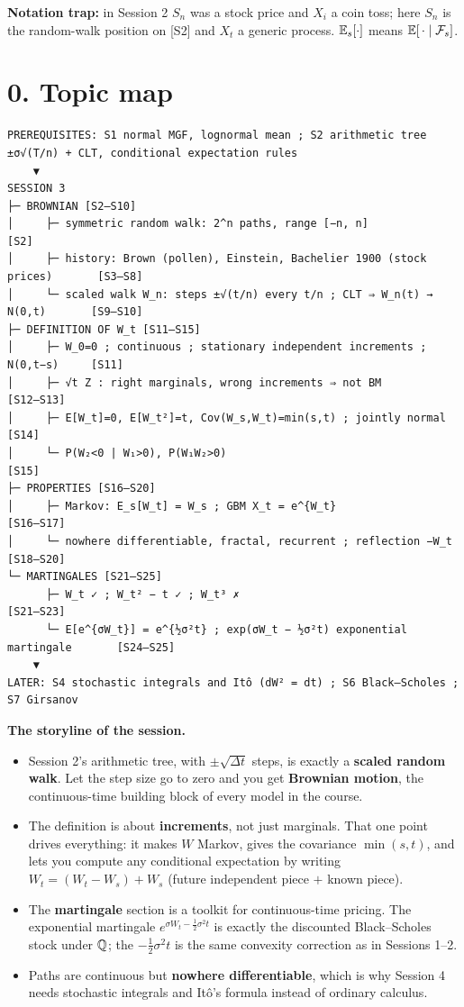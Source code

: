 \documentclass[10pt]{article}
\begin{document}
\textbf{Notation trap:} in Session 2 $S_n$ was a stock price and $X_i$ a coin toss; here $S_n$ is the random-walk position on [S2] and $X_t$ a generic process. $\mathbb{E}_s[\cdot]$ means $\mathbb{E}[\,\cdot\mid\mathcal{F}_s]$.

\section*{0. Topic map}
\begin{lstlisting}
PREREQUISITES: S1 normal MGF, lognormal mean ; S2 arithmetic tree ±σ√(T/n) + CLT, conditional expectation rules
    ▼
SESSION 3
├─ BROWNIAN [S2–S10]
│     ├─ symmetric random walk: 2^n paths, range [−n, n]                        [S2]
│     ├─ history: Brown (pollen), Einstein, Bachelier 1900 (stock prices)       [S3–S8]
│     └─ scaled walk W_n: steps ±√(t/n) every t/n ; CLT ⇒ W_n(t) → N(0,t)       [S9–S10]
├─ DEFINITION OF W_t [S11–S15]
│     ├─ W_0=0 ; continuous ; stationary independent increments ; N(0,t−s)     [S11]
│     ├─ √t Z : right marginals, wrong increments ⇒ not BM                      [S12–S13]
│     ├─ E[W_t]=0, E[W_t²]=t, Cov(W_s,W_t)=min(s,t) ; jointly normal           [S14]
│     └─ P(W₂<0 | W₁>0), P(W₁W₂>0)                                              [S15]
├─ PROPERTIES [S16–S20]
│     ├─ Markov: E_s[W_t] = W_s ; GBM X_t = e^{W_t}                             [S16–S17]
│     └─ nowhere differentiable, fractal, recurrent ; reflection −W_t          [S18–S20]
└─ MARTINGALES [S21–S25]
      ├─ W_t ✓ ; W_t² − t ✓ ; W_t³ ✗                                            [S21–S23]
      └─ E[e^{σW_t}] = e^{½σ²t} ; exp(σW_t − ½σ²t) exponential martingale       [S24–S25]
    ▼
LATER: S4 stochastic integrals and Itô (dW² = dt) ; S6 Black–Scholes ; S7 Girsanov
\end{lstlisting}
\textbf{The storyline of the session.}
\begin{itemize}
\item Session 2's arithmetic tree, with $\pm\sqrt{\Delta t}$ steps, is exactly a \textbf{scaled random walk}. Let the step size go to zero and you get \textbf{Brownian motion}, the continuous-time building block of every model in the course.
\item The definition is about \textbf{increments}, not just marginals. That one point drives everything: it makes $W$ Markov, gives the covariance $\min(s,t)$, and lets you compute any conditional expectation by writing $W_t=(W_t-W_s)+W_s$ (future independent piece $+$ known piece).
\item The \textbf{martingale} section is a toolkit for continuous-time pricing. The exponential martingale $e^{\sigma W_t-\frac12\sigma^2t}$ is exactly the discounted Black--Scholes stock under $\mathbb{Q}$; the $-\frac12\sigma^2t$ is the same convexity correction as in Sessions 1--2.
\item Paths are continuous but \textbf{nowhere differentiable}, which is why Session 4 needs stochastic integrals and Itô's formula instead of ordinary calculus.
\end{itemize}
\end{document}
